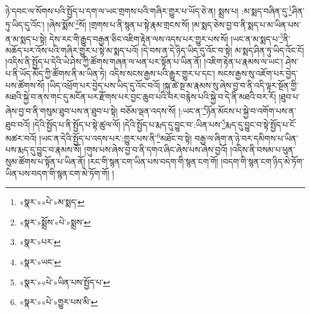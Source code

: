 ཉེ་དབང་ལ་སོགས་པའི་སྤྱོད་པ་དག་ལ་ཡང་གྲགས་པའི་གཞིར་གྱུར་པ་ཡོད་ཅེ་ན། སྨྲས་པ། :མ་སྨད་བཞིན་དུ་\footnote{«སྣར་»«པེ་»མ་སྨད་}ཤིན་ཏུ་ཡིད་དུ་འོང་། །ཞེས་སྨོས་\footnote{«སྣར་»སྨྲོས་«པེ་»སྨྲས་}སོ། །གྲགས་པ་ནི་སྙན་པ་སྟེ་རྣམ་གྲངས་སོ། །མ་སྨད་ཅེས་བྱ་བ་ནི་སྨད་པ་མ་ཡིན་པས་ན་མ་སྨད་པ་སྟེ། དེས་རང་གི་རྒྱུད་བརྒྱན་ཅིང་འཇིག་རྟེན་ལས་འདས་པར་གྱུར་པས་སོ། །ཡང་ན་མ་སྨད་པ་\footnote{«སྣར་»པར་}ནི་མཆོད་པར་འོས་པའི་གཞིར་གྱུར་པ་སྟེ་མ་སྨད་པའོ། །དེ་བས་ན་དེ་ཉིད་ཡིད་དུ་འོང་བ་སྟེ། མ་སྨད་ཤིན་ཏུ་ཡིད་འོང་ངོ། །འདིས་ནི་སྤྱོད་པ་དེའི་ཡེ་ཤེས་ཀྱི་ཚོགས་གཞན་ལ་ཕན་པར་སྟོན་པ་ཡིན་ནོ། །འཇིག་རྟེན་པ་རྣམས་ལ་ཡང་། ཤེས་པ་ནི་ཡོད་མོད་ཀྱི་ཚོགས་ནི་མ་ཡིན་ཏེ། འདིས་སངས་རྒྱས་པའི་རྒྱུར་གྱུར་པ་དང་། སངས་རྒྱས་སུ་འཇོག་པར་བྱེད་པས་ཚོགས་སོ། །ཡིད་འཕྲོག་པར་བྱེད་པས་ཡིད་དུ་འོང་བའོ། །སྐུ་ཚེ་སྔ་མ་རྣམས་སུ་ཞེས་བྱ་བ་ནི་འདི་ལྟར་སྔོན་གྱི་མཐའི་སྐྱེ་བ་ནས་གང་དུ་མངོན་པར་རྫོགས་པར་བྱང་ཆུབ་པའི་བར་བརྙེས་པའི་སྐྱེ་བ་དེ་ནི་མཐའི་བར་རོ། །ཐུབ་པ་ཞེས་བྱ་བ་ནི་གསུམ་ཐུབ་པས་ན་ཐུབ་པ་སྟེ། བཅོམ་ལྡན་འདས་སོ། །:ཡང་ན་\footnote{«སྣར་»ཡང་}ཉོན་མོངས་པ་སྐྱེ་བ་འགོག་པས་ན་ཐུབ་བའོ། །དེའི་སྤྱོད་པ་ནི་སྤྱོད་པ་སྟེ་ཚུལ་ལོ། །དེའི་སྤྱོད་པ་རྨད་དུ་བྱུང་བ་:ཡིན་པས་\footnote{«སྣར་»«པེ་»ཡིན་པས་སྤྱོད་པ་}རྨད་དུ་བྱུང་བ་སྟེ་སྤྱོད་པ་ངོ་མཚར་བའོ། །ཡང་ན་དེའི་སྤྱོད་པ་འདས་པར་:གྱུར་པས་ནི་\footnote{«སྣར་»«པེ་»གྱུར་པས་མི་}མཐོང་བ་སྟེ། བརྒྱ་ལ་ཞིག་ན་ཉེ་བར་དམིགས་པ་ཡིན་པས་རྨད་དུ་བྱུང་བ་རྣམས་སོ། །གུས་པས་ཞེས་བྱ་བ་ནི་དགའ་ཞིང་ཞེས་པས་ཞེས་བྱའོ། །འདིས་ནི་བསམ་པ་ཕུན་སུམ་ཚོགས་པ་སྟོན་པ་ཡིན་ནོ། །རང་གི་སྙན་ངག་ཡིན་པས་བདག་གི་སྙན་ངག་གོ། །བདག་གི་སྙན་ངག་ཉིད་མེ་ཏོག་ཡིན་པས་བདག་གི་སྙན་ངག་མེ་ཏོག་གོ། །

